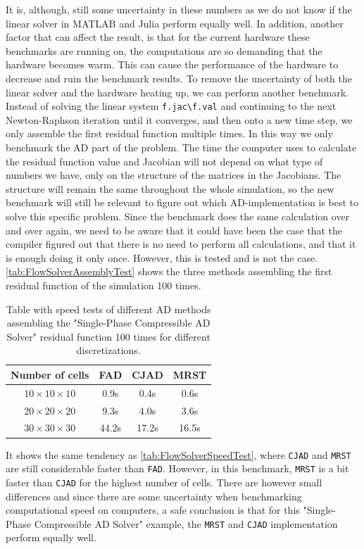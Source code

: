 It is, although, still some uncertainty in these numbers as we do not know if the linear solver in MATLAB and Julia perform equally well. In addition, another factor that can affect the result, is that for the current hardware these benchmarks are running on, the computations are so demanding that the hardware becomes warm. This can cause the performance of the hardware to decrease and ruin the benchmark results. To remove the uncertainty of both the linear solver and the hardware heating up, we can perform another benchmark. Instead of solving the linear system \texttt{f.jac\textbackslash f.val} and continuing to the next Newton-Raphson iteration until it converges, and then onto a new time step, we only assemble the first residual function multiple times. In this way we only benchmark the AD part of the problem. The time the computer uses to calculate the residual function value and Jacobian will not depend on what type of numbers we have, only on the structure of the matrices in the Jacobians. The structure will remain the same throughout the whole simulation, so the new benchmark will still be relevant to figure out which AD-implementation is best to solve this specific problem. Since the benchmark does the same calculation over and over again, we need to be aware that it could have been the case that the compiler figured out that there is no need to perform all calculations, and that it is enough doing it only once. However, this is tested and is not the case. \autoref{tab:FlowSolverAssemblyTest} shows the three methods assembling the first residual function of the simulation 100 times.
\begin{table}[b]
    \centering
    \caption{Table with speed tests of different AD methods assembling the "Single-Phase Compressible AD Solver" residual function 100 times for different discretizations.}
    \label{tab:FlowSolverAssemblyTest}
    \def\arraystretch{1.5}
    \begin{tabular}{cccc}
    \textbf{Number of cells} & \textbf{FAD} & \textbf{CJAD} & \textbf{MRST}\\
        \hline
         $10\times10\times10$ & 0.9s & 0.4s & 0.6s  \\  
         $20\times20\times20$ & 9.3s & 4.0s & 3.6s \\ 
         $30\times30\times30$ & 44.2s& 17.2s& 16.5s \\ \hline
    \end{tabular}
\end{table}
It shows the same tendency as \autoref{tab:FlowSolverSpeedTest}, where \texttt{CJAD} and \texttt{MRST} are still considerable faster than \texttt{FAD}. However, in this benchmark, \texttt{MRST} is a bit faster than \texttt{CJAD} for the highest number of cells. There are however small differences and since there are some uncertainty when benchmarking computational speed on computers, a safe conclusion is that for this "Single-Phase Compressible AD Solver" example, the \texttt{MRST} and \texttt{CJAD} implementation perform equally well.